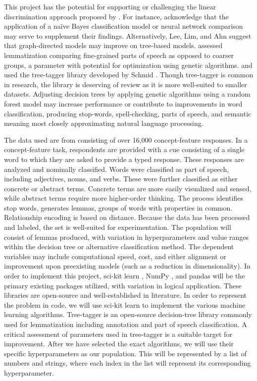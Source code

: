 \documentclass{article}
\begin{document}
This project has the potential for supporting or challenging the linear discrimination approach proposed by \citep{baayen2019discriminative}. For instance, \citep{baayen2019discriminative} acknowledge that the application of a naïve Bayes classification model or neural network comparison may serve to supplement their findings. Alternatively, Lee, Lim, and Ahn \citep{lee2019automotive} suggest that graph-directed models may improve on tree-based models. \cite{gleim2019practitioner} assessed lemmatization comparing fine-grained parts of speech as opposed to coarser groups, a parameter with potential for optimization using genetic algorithms. \citep{baayen2019discriminative} and \citep{buchanan_dedeyne_montefinese_2019} used the tree-tagger library developed by Schmid \citep{schmid1994probabilistic, schmid1999improvements}. Though tree-tagger is common in research, the library is deserving of review as it is more well-suited to smaller datasets. Adjusting decision trees by applying genetic algorithms using a random forest model may increase performance or contribute to improvements in word classification, producing stop-words, spell-checking, parts of speech, and semantic meaning most closely approximating natural language processing. 

The data used are from \citep{buchanan_dedeyne_montefinese_2019} consisting of over 16,000 concept-feature responses. In a concept-feature task, respondents are provided with a cue consisting of a single word to which they are asked to provide a typed response. These responses are analyzed and nominally classified. Words were classified as part of speech, including adjectives, nouns, and verbs. These were further classified as either concrete or abstract terms. Concrete terms are more easily visualized and sensed, while abstract terms require more higher-order thinking. The process identifies stop words, generates lemmas, groups of words with properties in common. Relationship encoding is based on distance. Because the data has been processed and labeled, the set is well-suited for experimentation.  
The population will consist of lemmas produced, with variation in hyperparameters and value ranges within the decision tree or alternative classification method. The dependent variables may include computational speed, cost, and either alignment or improvement upon preexisting models (such as a reduction in dimensionality). In order to implement this project, sci-kit learn \citep{pedregosa2011scikit}, NumPy \citep{oliphant2006guide}, and pandas \citep{mckinney2010data} will be the primary existing packages utilized, with variation in logical application. These libraries are open-source and well-established in literature. In order to represent the problem in code, we will use sci-kit learn to implement the various machine learning algorithms. Tree-tagger is an open-source decision-tree library commonly used for lemmatization including annotation and part of speech classification. A critical assessment of parameters used in tree-tagger is a suitable target for improvement. After we have selected the exact algorithms, we will use their specific hyperparameters as our population. This will be represented by a list of numbers and strings, where each index in the list will represent its corresponding hyperparameter.  
\end{document}
